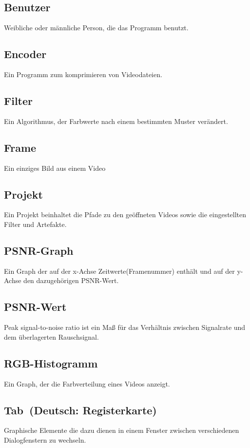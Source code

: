 \documentclass[parskip=full]{scrartcl}
\begin{document}
\subsection*{Benutzer} 
Weibliche oder männliche Person, die das Programm benutzt.
\subsection*{Encoder} 
Ein Programm zum komprimieren von Videodateien.
\subsection*{Filter} 
Ein Algorithmus, der Farbwerte nach einem bestimmten Muster verändert.
\subsection*{Frame}
Ein einziges Bild aus einem Video
\subsection*{Projekt} 
Ein Projekt beinhaltet die Pfade zu den geöffneten Videos sowie die eingestellten Filter und Artefakte.
\subsection*{PSNR-Graph} 
Ein Graph der auf der x-Achse Zeitwerte(Framenummer) enthält und auf der y-Achse den dazugehörigen PSNR-Wert.
\subsection*{PSNR-Wert} 
Peak signal-to-noise ratio ist ein Maß für das Verhältnis zwischen Signalrate und dem überlagerten Rauschsignal.
\subsection*{RGB-Histogramm} 
Ein Graph, der die Farbverteilung eines Videos anzeigt.
\subsection*{Tab\ (Deutsch: Registerkarte)}
Graphische Elemente die dazu dienen in einem Fenster zwischen verschiedenen Dialogfenstern zu wechseln.
\end{document}
